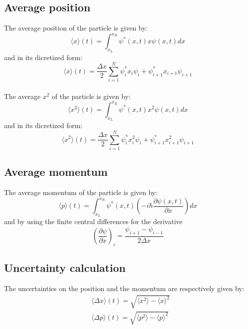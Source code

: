 \documentclass[a4paper,12pt,twoside]{article}
\begin{document}
  \subsection{Average position}
  The average position of the particle is given by:
  \begin{equation}
   \langle x \rangle(t) = \int_{x_L}^{x_R}\psi^*(x,t)x\psi(x,t)dx
  \end{equation}
  and in its dicretized form:
  \begin{equation}
   \langle x \rangle(t) = \frac{\Delta x}{2} \sum_{i=1}^{N} \psi_i^*x_i\psi_i + \psi_{i+1}^*x_{i+1}\psi_{i+1}
  \end{equation}\\
  The average $x^2$ of the particle is given by:
  \begin{equation}
   \langle x^2 \rangle(t) = \int_{x_L}^{x_R}\psi^*(x,t)x^2\psi(x,t)dx
  \end{equation}
  and in its dicretized form:
  \begin{equation}
   \langle x^2 \rangle(t) = \frac{\Delta x}{2} \sum_{i=1}^{N} \psi_i^*x_i^2\psi_i + \psi_{i+1}^*x_{i+1}^2\psi_{i+1}
  \end{equation}

  \subsection{Average momentum}
  The average momentum of the particle is given by:
  \begin{equation}
   \langle p \rangle(t) = \int_{x_L}^{x_R}\psi^*(x,t)\left(-i\hbar\frac{\partial\psi(x,t)}{\partial x}\right)dx
  \end{equation}
  and by using the finite central differences for the derivative
  \begin{equation*}
   \left(\frac{\partial\psi}{\partial x}\right)_i = \frac{\psi_{i+1}-\psi_{i-1}}{2\Delta x}
  \end{equation*}%

  \subsection{Uncertainty calculation}
  The uncertainties on the position and the momentum are respectively given by:
  \begin{align}
   &\langle \Delta x\rangle(t) = \sqrt{\langle x^2 \rangle - \langle x \rangle^2}\\
   &\langle \Delta p\rangle(t) = \sqrt{\langle p^2 \rangle - \langle p \rangle^2}
  \end{align}
\end{document}

